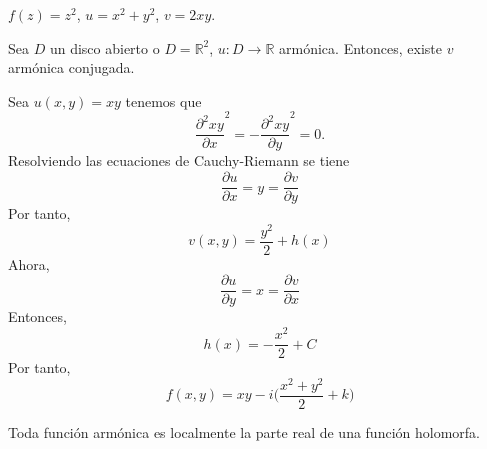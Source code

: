 \begin{ejm}
  $f(z) = z^{2}$, $u = x^{2} + y^{2}$, $v = 2xy$.
\end{ejm}

\begin{theo}
  Sea $D$ un disco abierto o $D = \mathbb{R}^{2}$, $u: D \to \mathbb{R}$ armónica. Entonces, existe $v$ armónica conjugada.
\end{theo}

\begin{ejm}
  Sea $u(x, y) = xy$ tenemos que 
  \[ 
    \frac{\partial^2{xy}}{\partial{x}}^2 = - \frac{\partial^2{xy}}{\partial{y}}^2 = 0.
  \] 
  Resolviendo las ecuaciones de Cauchy-Riemann se tiene
  \[ 
    \frac{\partial{u}}{\partial{x}} = y = \frac{\partial{v}}{\partial{y}} 
  \] 
  Por tanto,
  \[ 
    v(x,y) = \frac{y^{2}}{2} + h(x) 
  \] 
  Ahora,
  \[ 
    \frac{\partial{u}}{\partial{y}} = x = \frac{\partial{v}}{\partial{x}} 
  \] 
  Entonces,
  \[ 
    h(x) = -\frac{x^{2}}{2} + C 
  \] 
  Por tanto,
  \[ 
    f(x, y) = xy -i \Big ( \frac{x^{2} + y^{2}}{2} + k \Big )
  \] 
\end{ejm}

 \begin{cor}
   Toda función armónica es localmente la parte real de una función holomorfa.
 \end{cor}

